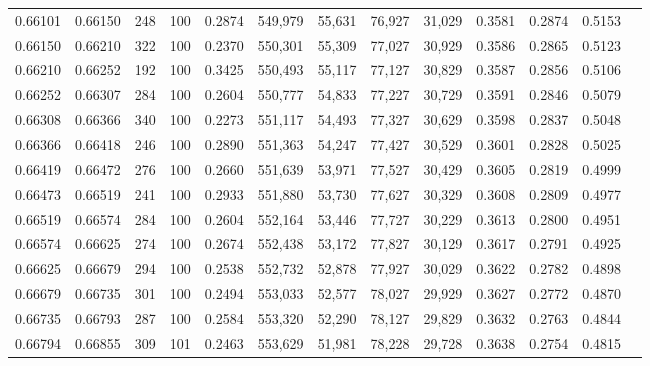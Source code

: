 \begin{tabular}{rrrrrrrrrrrrr}
0.66101 & 0.66150 &   248 & 100 &                                     0.2874 & 549,979 &  55,631 &  76,927 &  31,029 & 0.3581 & 0.2874 & 0.5153 \\
0.66150 & 0.66210 &   322 & 100 &                                     0.2370 & 550,301 &  55,309 &  77,027 &  30,929 & 0.3586 & 0.2865 & 0.5123 \\
0.66210 & 0.66252 &   192 & 100 &                                     0.3425 & 550,493 &  55,117 &  77,127 &  30,829 & 0.3587 & 0.2856 & 0.5106 \\
0.66252 & 0.66307 &   284 & 100 &                                     0.2604 & 550,777 &  54,833 &  77,227 &  30,729 & 0.3591 & 0.2846 & 0.5079 \\
0.66308 & 0.66366 &   340 & 100 &                                     0.2273 & 551,117 &  54,493 &  77,327 &  30,629 & 0.3598 & 0.2837 & 0.5048 \\
0.66366 & 0.66418 &   246 & 100 &                                     0.2890 & 551,363 &  54,247 &  77,427 &  30,529 & 0.3601 & 0.2828 & 0.5025 \\
0.66419 & 0.66472 &   276 & 100 &                                     0.2660 & 551,639 &  53,971 &  77,527 &  30,429 & 0.3605 & 0.2819 & 0.4999 \\
0.66473 & 0.66519 &   241 & 100 &                                     0.2933 & 551,880 &  53,730 &  77,627 &  30,329 & 0.3608 & 0.2809 & 0.4977 \\
0.66519 & 0.66574 &   284 & 100 &                                     0.2604 & 552,164 &  53,446 &  77,727 &  30,229 & 0.3613 & 0.2800 & 0.4951 \\
0.66574 & 0.66625 &   274 & 100 &                                     0.2674 & 552,438 &  53,172 &  77,827 &  30,129 & 0.3617 & 0.2791 & 0.4925 \\
0.66625 & 0.66679 &   294 & 100 &                                     0.2538 & 552,732 &  52,878 &  77,927 &  30,029 & 0.3622 & 0.2782 & 0.4898 \\
0.66679 & 0.66735 &   301 & 100 &                                     0.2494 & 553,033 &  52,577 &  78,027 &  29,929 & 0.3627 & 0.2772 & 0.4870 \\
0.66735 & 0.66793 &   287 & 100 &                                     0.2584 & 553,320 &  52,290 &  78,127 &  29,829 & 0.3632 & 0.2763 & 0.4844 \\
0.66794 & 0.66855 &   309 & 101 &                                     0.2463 & 553,629 &  51,981 &  78,228 &  29,728 & 0.3638 & 0.2754 & 0.4815 \\

\end{tabular}
